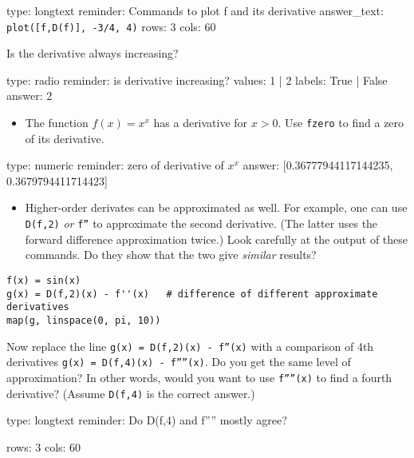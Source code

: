 \documentclass[12pt]{article}
\begin{document}
\begin{answer}
type: longtext
reminder: Commands to plot f and its derivative
answer_text: \verb+plot([f,D(f)], -3/4, 4)+ 
rows: 3
cols: 60
\end{answer}

Is the derivative always increasing?

\begin{answer}
type: radio
reminder: is derivative increasing?
values: 1 | 2
labels: True | False
answer: 2
\end{answer}

\begin{itemize}
\itemsep1pt\parskip0pt
\item
  The function $f(x) = x^x$ has a derivative for $x > 0$. Use
  \texttt{fzero} to find a zero of its derivative.
\end{itemize}

\begin{answer}
    type: numeric
    reminder: zero of derivative of \( x^x \)
    answer: [0.36777944117144235, 0.3679794411714423]

\end{answer}

\begin{itemize}
\itemsep1pt\parskip0pt
\item
  Higher-order derivates can be approximated as well. For example, one
  can use \texttt{D(f,2)} \emph{or} \texttt{f''} to approximate the
  second derivative. (The latter uses the forward difference
  approximation twice.) Look carefully at the output of these commands.
  Do they show that the two give \emph{similar} results?
\end{itemize}



\begin{verbatim}
f(x) = sin(x)
g(x) = D(f,2)(x) - f''(x)   # difference of different approximate derivatives
map(g, linspace(0, pi, 10))
\end{verbatim}
Now replace the line \texttt{g(x) = D(f,2)(x) - f''(x)} with a
comparison of 4th derivatives \texttt{g(x) = D(f,4)(x) - f''''(x)}. Do
you get the same level of approximation? In other words, would you want
to use \texttt{f''''(x)} to find a fourth derivative? (Assume
\texttt{D(f,4)} is the correct answer.)

\begin{answer}
type: longtext
reminder: Do D(f,4) and f'''' mostly agree?

rows: 3
cols: 60
\end{answer}
\end{document}

